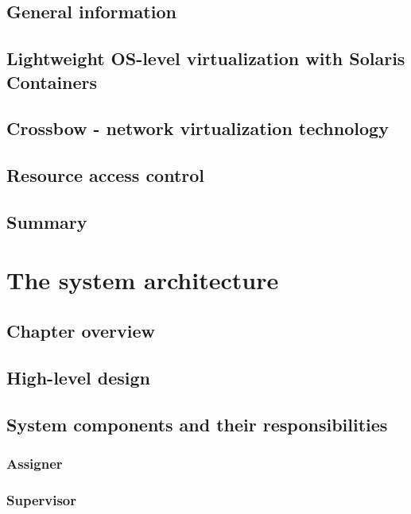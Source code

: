 \documentclass[11pt]{book}
\begin{document}
    \section{General information}

    \section{Lightweight OS-level virtualization with Solaris Containers}

    \section{Crossbow - network virtualization technology}

    \section{Resource access control}

    \section{Summary}


  \chapter{The system architecture}

    \section{Chapter overview}



    \section{High-level design}


    \section{System components and their responsibilities}

      \subsection{Assigner}

      \subsection{Supervisor}
\end{document}
